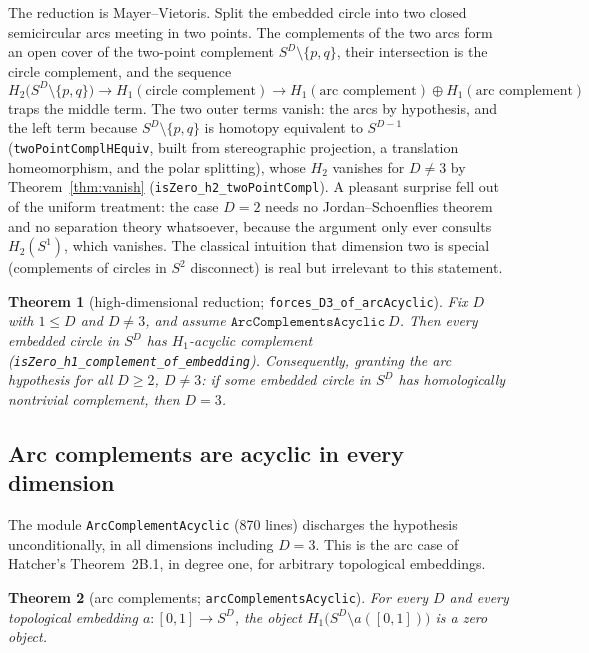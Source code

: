 \documentclass[11pt]{article}
\newtheorem{theorem}{Theorem}[section]
\theoremstyle{remark}
\newcommand{\leanname}[1]{\texttt{#1}}
\begin{document}
The reduction is Mayer--Vietoris. Split the embedded circle into two closed
semicircular arcs meeting in two points. The complements of the two arcs
form an open cover of the two-point complement
$S^D \setminus \{p, q\}$, their intersection is the circle complement, and
the sequence
\[
H_2\bigl(S^D \setminus \{p,q\}\bigr) \to H_1(\text{circle complement})
\to H_1(\text{arc complement}) \oplus H_1(\text{arc complement})
\]
traps the middle term. The two outer terms vanish: the arcs by hypothesis,
and the left term because $S^D \setminus \{p, q\}$ is homotopy equivalent to
$S^{D-1}$ (\leanname{twoPointComplHEquiv}, built from stereographic
projection, a translation homeomorphism, and the polar splitting), whose
$H_2$ vanishes for $D \ne 3$ by Theorem~\ref{thm:vanish}
(\leanname{isZero\_h2\_twoPointCompl}). A pleasant surprise fell out of the
uniform treatment: the case $D = 2$ needs no Jordan--Schoenflies theorem and
no separation theory whatsoever, because the argument only ever consults
$H_2(S^1)$, which vanishes. The classical intuition that dimension two is
special (complements of circles in $S^2$ disconnect) is real but
irrelevant to this statement.

\begin{theorem}[high-dimensional reduction;
\leanname{forces\_D3\_of\_arcAcyclic}]\label{thm:highdim}
Fix $D$ with $1 \le D$ and $D \ne 3$, and assume
$\leanname{ArcComplementsAcyclic}\ D$. Then every embedded circle in $S^D$
has $H_1$-acyclic complement
(\leanname{isZero\_h1\_complement\_of\_embedding}). Consequently, granting the arc hypothesis for
all $D \ge 2$, $D \ne 3$: if some embedded circle in $S^D$ has
homologically nontrivial complement, then $D = 3$.
\end{theorem}

\subsection{Arc complements are acyclic in every dimension}

The module \leanname{ArcComplementAcyclic} (870 lines) discharges the
hypothesis unconditionally, in all dimensions including $D = 3$. This is the
arc case of Hatcher's Theorem~2B.1, in degree one, for arbitrary topological
embeddings.

\begin{theorem}[arc complements; \leanname{arcComplementsAcyclic}]
\label{thm:arc}
For every $D$ and every topological embedding
$a : [0,1] \to S^D$, the object
$H_1\bigl(S^D \setminus a([0,1])\bigr)$ is a zero object.
\end{theorem}
\end{document}
